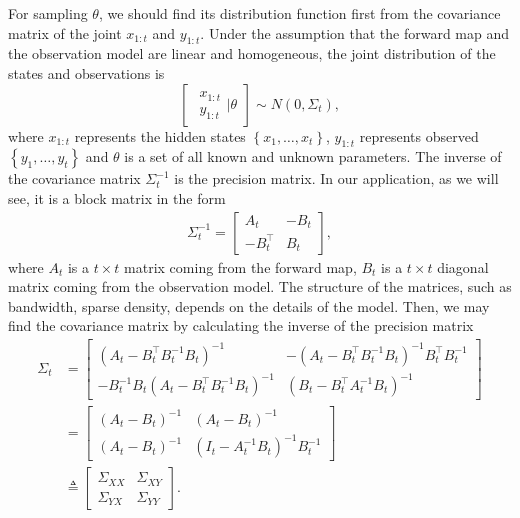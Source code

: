 For sampling $\theta$, we should find its distribution function first from the covariance matrix of the joint $x_{1:t}$ and $y_{1:t}$. Under the assumption that the forward map and the observation model are linear and homogeneous, the joint distribution of the states and observations is  
\begin{equation}\label{generaljointmatrix}
\begin{bmatrix} \begin{matrix} x_{1:t}\\ y_{1:t}  \end{matrix} \biggr\rvert \theta \end{bmatrix}
\sim N\left(0, \Sigma_t \right),
\end{equation}
where $x_{1:t}$ represents the hidden states $\left\lbrace x_1,\dots,x_t\right\rbrace$, $y_{1:t}$ represents observed $\left\lbrace y_1,\dots,y_t\right\rbrace$ and $\theta$ is a set of all known and unknown parameters. The inverse of the covariance matrix $\Sigma_t^{-1}$ is the precision matrix. In our application, as we will see, it is a block matrix in the form  
\begin{align*} \Sigma_t^{-1}=
\begin{bmatrix}
A_t& -B_t \\ -B_t^\top & B_t
\end{bmatrix}, 
\end{align*}
where $A_t$ is a $t \times t$ matrix coming from the forward map, $B_t$ is a $t\times t$ diagonal matrix coming from the observation model. The structure of the matrices, such as bandwidth, sparse density, depends on the details of the model. %
Then, we may find the covariance matrix by calculating the inverse of the precision matrix 
\begin{align*}
\Sigma_t &= \begin{bmatrix}
\left(A_t-B_t^\top B_t^{-1}B_t\right) ^{-1} & -\left(A_t-B_t^\top B_t^{-1}B_t\right)^{-1}B_t^\top B_t^{-1}\\
- B_t^{-1}B_t\left(A_t-B_t^\top B_t^{-1}B_t\right)^{-1} & \left(B_t-B_t^\top A_t^{-1}B_t\right) ^{-1}
\end{bmatrix} \\
&= \begin{bmatrix}
\left(A_t-B_t\right) ^{-1} & \left(A_t-B_t\right)^{-1}\\
\left(A_t-B_t\right)^{-1} & \left(I_t- A_t^{-1}B_t\right) ^{-1}B_t^{-1}
\end{bmatrix} \\
&\triangleq \begin{bmatrix}
\Sigma_{XX} & \Sigma_{XY} \\
\Sigma_{YX}  &\Sigma_{YY} 
\end{bmatrix}.
\end{align*}
